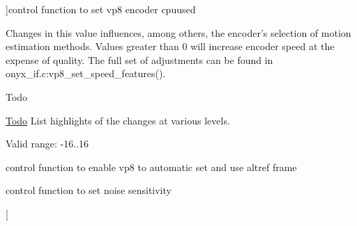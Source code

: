 \begin{Desc}
\begin{description}
{}]control function to set vp8 encoder cpuused \begin{DoxyVerb}Changes in this value influences, among others, the encoder's selection
of motion estimation methods. Values greater than 0 will increase encoder
speed at the expense of quality.
The full set of adjustments can be found in
onyx_if.c:vp8_set_speed_features().
\end{DoxyVerb}
 \begin{DoxyRefDesc}{Todo}
\item[\hyperlink{todo__todo000001}{Todo}]List highlights of the changes at various levels.\end{DoxyRefDesc}
\begin{DoxyVerb}\note Valid range: -16..16\end{DoxyVerb}
 \item[{\em 
\hypertarget{group__vp8__encoder_gga6deae3d561c838952552c3d3756322eca24a5530efabb8b4949d01622b1d72cb0}{V\-P8\-E\-\_\-\-S\-E\-T\-\_\-\-E\-N\-A\-B\-L\-E\-A\-U\-T\-O\-A\-L\-T\-R\-E\-F}\label{group__vp8__encoder_gga6deae3d561c838952552c3d3756322eca24a5530efabb8b4949d01622b1d72cb0}
}]control function to enable vp8 to automatic set and use altref frame \item[{\em 
\hypertarget{group__vp8__encoder_gga6deae3d561c838952552c3d3756322eca3fa90cb70bade72af3c2d8d91471a36c}{V\-P8\-E\-\_\-\-S\-E\-T\-\_\-\-N\-O\-I\-S\-E\-\_\-\-S\-E\-N\-S\-I\-T\-I\-V\-I\-T\-Y}\label{group__vp8__encoder_gga6deae3d561c838952552c3d3756322eca3fa90cb70bade72af3c2d8d91471a36c}
}]control function to set noise sensitivity \item[{\em 
}
\end{description}
\end{Desc}
